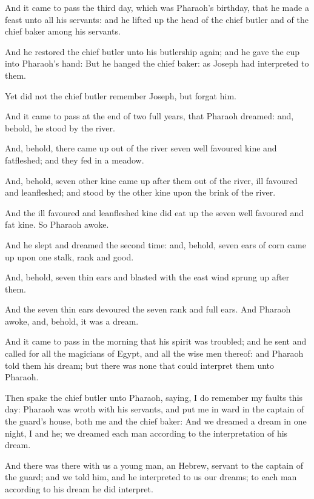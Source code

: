 \Verse And it came to pass the third day, which was Pharaoh's birthday, that he made a feast unto all his servants: and he lifted up the head of the chief butler and of the chief baker among his servants.

\Verse And he restored the chief butler unto his butlership again; and he gave the cup into Pharaoh's hand: \Verse But he hanged the chief baker: as Joseph had interpreted to them.

\Verse Yet did not the chief butler remember Joseph, but forgat him.

\Chapter
\Verse And it came to pass at the end of two full years, that Pharaoh dreamed: and, behold, he stood by the river.

\Verse And, behold, there came up out of the river seven well favoured kine and fatfleshed; and they fed in a meadow.

\Verse And, behold, seven other kine came up after them out of the river, ill favoured and leanfleshed; and stood by the other kine upon the brink of the river.

\Verse And the ill favoured and leanfleshed kine did eat up the seven well favoured and fat kine. So Pharaoh awoke.

\Verse And he slept and dreamed the second time: and, behold, seven ears of corn came up upon one stalk, rank and good.

\Verse And, behold, seven thin ears and blasted with the east wind sprung up after them.

\Verse And the seven thin ears devoured the seven rank and full ears.  And Pharaoh awoke, and, behold, it was a dream.

\Verse And it came to pass in the morning that his spirit was troubled; and he sent and called for all the magicians of Egypt, and all the wise men thereof: and Pharaoh told them his dream; but there was none that could interpret them unto Pharaoh.

\Verse Then spake the chief butler unto Pharaoh, saying, I do remember my faults this day: \Verse Pharaoh was wroth with his servants, and put me in ward in the captain of the guard's house, both me and the chief baker: \Verse And we dreamed a dream in one night, I and he; we dreamed each man according to the interpretation of his dream.

\Verse And there was there with us a young man, an Hebrew, servant to the captain of the guard; and we told him, and he interpreted to us our dreams; to each man according to his dream he did interpret.


